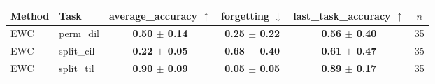 \begin{tabular}{llcccc}
\toprule
Method & Task & average\_accuracy $\uparrow$ & forgetting $\downarrow$ & last\_task\_accuracy $\uparrow$ & $n$ \\
\midrule
EWC & perm\_dil & \textbf{0.50 $\pm$ 0.14} & \textbf{0.25 $\pm$ 0.22} & \textbf{0.56 $\pm$ 0.40} & 35 \\
\midrule
EWC & split\_cil & \textbf{0.22 $\pm$ 0.05} & \textbf{0.68 $\pm$ 0.40} & \textbf{0.61 $\pm$ 0.47} & 35 \\
\midrule
EWC & split\_til & \textbf{0.90 $\pm$ 0.09} & \textbf{0.05 $\pm$ 0.05} & \textbf{0.89 $\pm$ 0.17} & 35 \\
\bottomrule
\end{tabular}
